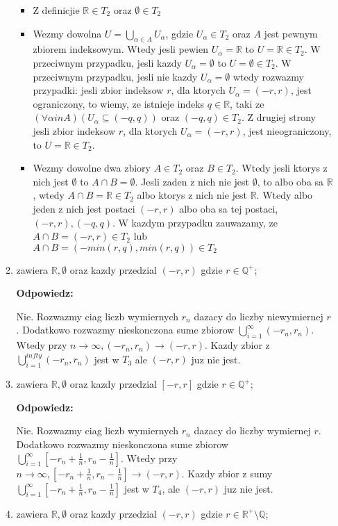 \documentclass{article}
\begin{document}
\begin{enumerate}
\begin{enumerate}[label={$T_{\arabic*} :$}]
\begin{itemize}
    \item Z definicjie $\mathbb{R} \in T_{2}$ oraz $\emptyset \in T_{2}$
    \item Wezmy dowolna $U = \bigcup\limits_{\alpha \in A}U_{\alpha}$, gdzie $U_{\alpha} \in T_{2}$ oraz $A$ jest pewnym zbiorem indeksowym. Wtedy jesli pewien $U_{\alpha} = \mathbb{R}$ to $U = \mathbb{R} \in T_{2}$. W przeciwnym przypadku, jesli kazdy $U_{\alpha} = \emptyset$ to $U = \emptyset \in T_{2}$. W przeciwnym przypadku, jesli nie kazdy $U_{\alpha} = \emptyset$ wtedy rozwazmy przypadki: jesli zbior indeksow $r$, dla ktorych $U_{\alpha} = (-r,r)$, jest ograniczony, to wiemy, ze istnieje indeks $q \in  \mathbb{R}$, taki ze $(\forall \alpha in A)(U_{\alpha} \subseteq (-q,q))$ oraz $(-q,q) \in T_{2}$. Z drugiej strony jesli zbior indeksow $r$, dla ktorych $U_{\alpha} = (-r,r)$, jest nieograniczony, to $U = \mathbb{R} \in T_{2}$. 
    \item Wezmy dowolne dwa zbiory $A \in T_{2}$ oraz $B \in T_{2}$. Wtedy jesli ktorys z nich jest $\emptyset$ to $A \cap B = \emptyset$. Jesli zaden z nich nie jest $\emptyset$, to albo oba sa $\mathbb{R}$, wtedy $A \cap B = \mathbb{R} \in T_{2}$ albo ktorys z nich nie jest $ \mathbb{R}$. Wtedy albo jeden z nich jest postaci $(-r,r)$ albo oba sa tej postaci, $(-r,r), (-q,q)$. W kazdym przypadku zauwazamy, ze $A \cap B = (-r,r) \in T_{2}$ lub $A \cap B = (-min(r,q), min(r,q)) \in T_{2}$
\end{itemize}
\item zawiera $\mathbb{R}, \emptyset$ oraz kazdy przedzial $(-r,r)$ gdzie $r \in {\mathbb{Q}}^{+}$;

\textbf{Odpowiedz:}

        Nie. Rozwazmy ciag liczb wymiernych $r_{n}$ dazacy do liczby niewymiernej $r$. Dodatkowo rozwazmy nieskonczona sume zbiorow $\bigcup\limits_{i=1}^{\infty}(-r_{n}, r_{n})$. Wtedy przy $n \rightarrow \infty, (-r_{n}, r_{n}) \rightarrow (-r, r)$. Kazdy zbior z  $\bigcup\limits_{i=1}^{infty}(-r_{n}, r_{n})$ jest w $T_{3}$ ale $(-r, r)$ juz nie jest.
\item zawiera $\mathbb{R}, \emptyset$ oraz kazdy przedzial $[-r,r]$ gdzie $r \in {\mathbb{Q}}^{+}$;

\textbf{Odpowiedz:}

        Nie. Rozwazmy ciag liczb wymiernych $r_{n}$ dazacy do liczby wymiernej $r$. Dodatkowo rozwazmy nieskonczona sume zbiorow $\bigcup\limits_{i=1}^{\infty}[-r_{n} + \frac{1}{n}, r_{n} - \frac{1}{n}]$. Wtedy przy $n  \rightarrow \infty, [-r_{n} + \frac{1}{n}, r_{n} - \frac{1}{n}] \rightarrow (-r, r)$. Kazdy zbior z sumy  $\bigcup\limits_{i=1}^{\infty}[-r_{n} + \frac{1}{n}, r_{n} - \frac{1}{n}]$ jest w $T_{4}$, ale $(-r, r)$ juz nie jest.
\item zawiera $\mathbb{R}, \emptyset$ oraz kazdy przedzial $(-r,r)$ gdzie $r \in {\mathbb{R}}^{+} \setminus \mathbb{Q}$;
 

\end{enumerate}
\end{enumerate}
\end{document}
